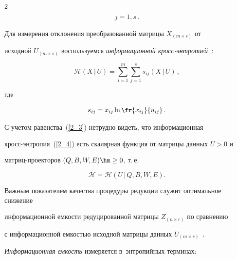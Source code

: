 \begin{multicols}{2}
\begin{multline}
j = \overline{1,s}\,.


\end{multline}


Для измерения отклонения преобразованной матрицы $X_{(m \times s)}$ от 


исходной $U_{(m \times s)}$ воспользуемся \textit{информационной кросс-эн\-тро\-пи\-ей}~\cite{Kullback_1951}:


\begin{equation}


\label{2_4}


\mathcal{H}(X\,|\,U) = \sum\limits^m_{i=1}\sum^s_{j=1} s_{ij}(X\,|\,U)\,,


\end{equation}


где


\begin{equation*}




s_{ij} = x_{ij} \ln \fr{x_{ij}}{u_{ij}}\,.


\end{equation*}


С учетом равенства~(\ref{2_3}) нетрудно видеть, что информационная 


кросс-эн\-тро\-пия~(\ref{2_4}) есть скалярная функция от матрицы данных $U > 0$ и 


мат\-риц-про\-ек\-то\-ров $(Q, B, W, E) \hm\ge 0$, т.\,е.


\begin{equation*}




\mathcal{H} = \mathcal{H}(U\,|\,Q,B,W,E).


\end{equation*}





Важным показателем качества процедуры редукции служит оптимальное снижение 


информационной емкости редуцированной матрицы $Z_{(n \times r)}$ по сравнению 


с информационной емкостью исходной матрицы данных $U_{(m \times 


s)}$~\cite{Popkov_2019_dan}.





\textit{Информационная емкость} измеряется в~энтропийных терминах:


\begin{align*}



\end{align*}
\end{multicols}
